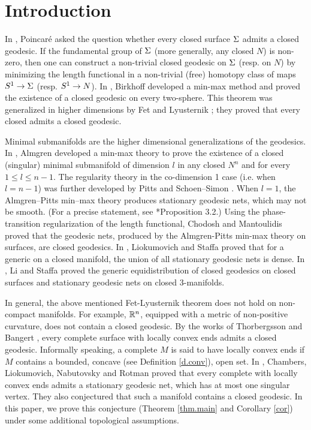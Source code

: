 \documentclass[11pt,twoside]{article}
\begin{document}
\section{Introduction}

In \cite{Poi}, Poincar\'{e} asked the question whether every closed \Rm surface $\Sigma$ admits a closed geodesic. If the fundamental group of $\Sigma$ (more generally, any closed \Rm \mf $N$) is non-zero, then one can construct a non-trivial closed geodesic on \(\Sigma\) (resp. on $N$) by minimizing the length functional in a non-trivial (free) homotopy class of maps $S^1 \rightarrow \Sigma$ (resp. $S^1 \rightarrow N$). In \cite{Bir}, Birkhoff developed a min-max method and proved the existence of a closed geodesic on every \Rm two-sphere. This theorem was generalized in higher dimensions by Fet and Lyusternik \cite{LF}; they proved that every closed \Rm \mf admits a closed geodesic.

Minimal submanifolds are the higher dimensional generalizations of the geodesics. In \cite{alm}, Almgren developed a min-max theory to prove the existence of a closed (singular) minimal submanifold of dimension $l$ in any closed \Rm \mf \(N^n\) and for every \(1\leq l\leq n-1\). The regularity theory in the co-dimension 1 case (i.e. when $l=n-1$) was further developed by Pitts \cite{pit} and Schoen–Simon \cite{ss}. When \(l=1\), the Almgren–Pitts min–max theory produces stationary geodesic nets, which may not be smooth. (For a precise statement, see \cite{LS}*{Proposition 3.2}.) Using the phase-transition regularization of the length functional, Chodosh and Mantoulidis \cite{CM23} proved that the geodesic nets, produced by the Almgren-Pitts min-max theory on surfaces, are closed geodesics. In \cite{LS}, Liokumovich and Staffa proved that for a generic \Rm \mt on a closed manifold, the union of all stationary geodesic nets is dense. In \cite{LiS}, Li and Staffa proved the generic equidistribution of closed geodesics on closed surfaces and stationary geodesic nets on closed 3-manifolds.

In general, the above mentioned Fet-Lyusternik theorem does not hold on non-compact manifolds. For example, \(\mathbb{R}^n\), equipped with a \Rm metric of non-positive curvature, does not contain a closed geodesic. By the works of Thorbergsson \cite{Tho} and Bangert \cite{Ban}, every complete \Rm surface with locally convex ends admits a closed geodesic. Informally speaking, a complete \Rm \mf $M$ is said to have locally convex ends if $M$ contains a bounded, concave (see Definition \ref{d.conv}), open set. In \cite{CLNR}, Chambers, Liokumovich, Nabutovsky and Rotman proved that every complete \Rm \mf with locally convex ends admits a stationary geodesic net, which has at most one singular vertex. They also conjectured that such a manifold contains a closed geodesic. In this paper, we prove this conjecture (Theorem \ref{thm.main} and Corollary \ref{cor}) under some additional topological assumptions.
\end{document}
